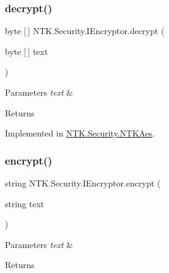 \subsubsection{\texorpdfstring{decrypt()}{decrypt()}\hspace{0.1cm}{\footnotesize\ttfamily [2/2]}}
{\footnotesize\ttfamily byte \mbox{[}$\,$\mbox{]} N\+T\+K.\+Security.\+I\+Encryptor.\+decrypt (\begin{DoxyParamCaption}\item[{byte \mbox{[}$\,$\mbox{]}}]{text }\end{DoxyParamCaption})}






\begin{DoxyParams}{Parameters}
{\em text} & \\
\hline
\end{DoxyParams}
\begin{DoxyReturn}{Returns}

\end{DoxyReturn}


Implemented in \mbox{\hyperlink{class_n_t_k_1_1_security_1_1_n_t_k_aes_a103d6e749268165cca16c0375497a702}{N\+T\+K.\+Security.\+N\+T\+K\+Aes}}.

\mbox{\label{interface_n_t_k_1_1_security_1_1_i_encryptor_a5ed0f74ca96c48c6b36c209e5847d3d1}} 
\subsubsection{\texorpdfstring{encrypt()}{encrypt()}\hspace{0.1cm}{\footnotesize\ttfamily [1/2]}}
{\footnotesize\ttfamily string N\+T\+K.\+Security.\+I\+Encryptor.\+encrypt (\begin{DoxyParamCaption}\item[{string}]{text }\end{DoxyParamCaption})}






\begin{DoxyParams}{Parameters}
{\em text} & \\
\hline
\end{DoxyParams}
\begin{DoxyReturn}{Returns}

\end{DoxyReturn}


